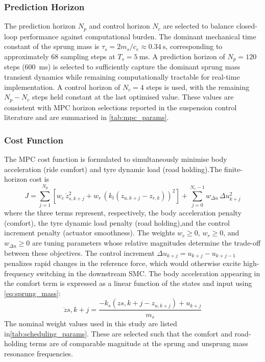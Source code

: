 \subsubsection{Prediction Horizon}\label{subsubsec:mpc_horizon}The prediction horizon $N_p$ and control horizon $N_c$ are selected to balance closed-loop performance against computational burden. The dominant mechanical time constant of the sprung mass is $\tau_s = 2m_s / c_e \approx \SI{0.34}{\second}$, corresponding to approximately 68 sampling steps at $T_s = \SI{5}{\milli\second}$. A prediction horizon of $N_p = 120$ steps (\SI{600}{\milli\second}) is selected to sufficiently capture the dominant sprung mass transient dynamics while remaining computationally tractable for real-time implementation. A control horizon of $N_c = 4$ steps is used, with the remaining $N_p - N_c$ steps held constant at the last optimised value. These values are consistent with MPC horizon selections reported in the suspension control literature and are summarised in \cref{tab:mpc_params}.

\subsubsection{Cost Function}\label{subsubsec:mpc_cost}The MPC cost function is formulated to simultaneously minimise body acceleration (ride comfort) and tyre dynamic load (road holding).The finite-horizon cost is 
\begin{equation}
    J = \sum_{j=1}^{N_p}
    \left[
        w_c\,\ddot{z}_{s,k+j}^2
        + w_r\,\left(k_t(z_{u,k+j} - z_{r,k})\right)^2
    \right]
    + \sum_{j=0}^{N_c-1} w_{\Delta u}\,\Delta u_{k+j}^2
    \label{eq:mpc_cost}
\end{equation}
where the three terms represent, respectively, the body acceleration penalty (comfort), the tyre dynamic load penalty (road holding),and the control increment penalty (actuator smoothness). The weights $w_c \geq 0$, $w_r \geq 0$, and $w_{\Delta u} \geq 0$ are tuning parameters whose relative magnitudes determine the trade-off between these objectives. The control increment $\Delta u_{k+j} = u_{k+j} -
u_{k+j-1}$ penalizes rapid changes in the reference force, which would otherwise excite high-frequency switching in the downstream SMC. The body acceleration appearing in the comfort term is expressed as a linear function of the states and input using \cref{eq:sprung_mass}:\begin{equation}\ddot{z}{s,k+j} = \frac{-k_s(z{s,k+j} - z_{u,k+j}) + u_{k+j}}{m_s}\label{eq:zdds}\end{equation}The nominal weight values used in this study are listed in\cref{tab:scheduling_params}. These are selected such that the comfort and road-holding terms are of comparable magnitude at the sprung and unsprung mass resonance frequencies.

